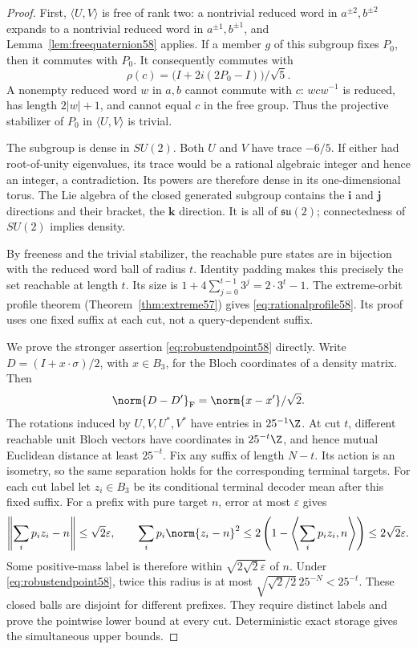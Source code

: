 \begin{proof}
First, $\langle U,V\rangle$ is free of rank two: a nontrivial reduced
word in $a^{\pm2},b^{\pm2}$ expands to a nontrivial reduced word in
$a^{\pm1},b^{\pm1}$, and Lemma~\ref{lem:freequaternion58} applies.
If a member $g$ of this subgroup fixes $P_0$, then it commutes with $P_0$.
It consequently commutes with
\[
             \rho(c)=\bigl(I+2i(2P_0-I)\bigr)/\sqrt5.
\]
A nonempty reduced word $w$ in $a,b$ cannot commute with $c$:
$wcw^{-1}$ is reduced, has length $2|w|+1$, and cannot equal $c$ in the
free group. Thus the projective stabilizer of $P_0$ in $\langle U,V\rangle$
is trivial.

The subgroup is dense in $SU(2)$. Both $U$ and $V$ have trace $-6/5$.
If either had root-of-unity eigenvalues, its trace would be a rational
algebraic integer and hence an integer, a contradiction. Its powers are
therefore dense in its one-dimensional torus. The Lie algebra of the
closed generated subgroup contains the $\mathbf i$ and $\mathbf j$
directions and their bracket, the $\mathbf k$ direction. It is all of
$\mathfrak{su}(2)$; connectedness of $SU(2)$ implies density.

By freeness and the trivial stabilizer, the reachable pure states are in
bijection with the reduced word ball of radius $t$. Identity padding
makes this precisely the set reachable at length $t$. Its size is
$1+4\sum_{j=0}^{t-1}3^j=2\cdot3^t-1$. The extreme-orbit profile theorem
(Theorem~\ref{thm:extreme57}) gives \eqref{eq:rationalprofile58}. Its proof
uses one fixed suffix at each cut, not a query-dependent suffix.

We prove the stronger assertion \eqref{eq:robustendpoint58} directly.
Write $D=(I+x\cdot\sigma)/2$, with $x\in B_3$, for the Bloch coordinates
of a density matrix. Then
\begin{equation}\label{eq:blochnorm58}
                  \norm{D-D'}_{\mathrm F}=\norm{x-x'}/\sqrt2.
\end{equation}
The rotations induced by $U,V,U^*,V^*$ have entries in
$25^{-1}\Z$. At cut $t$, different reachable unit Bloch vectors have
coordinates in $25^{-t}\Z$, and hence mutual Euclidean distance at least
$25^{-t}$. Fix any suffix of length $N-t$. Its action is an isometry, so
the same separation holds for the corresponding terminal targets.
For each cut label let $z_i\in B_3$ be its conditional terminal decoder
mean after this fixed suffix. For a prefix with pure target $n$, error
at most $\varepsilon$ gives
\[
 \left\|\sum_i p_i z_i-n\right\|\le\sqrt2\varepsilon,
 \qquad
 \sum_i p_i\norm{z_i-n}^2
       \le2\left(1-\left\langle\sum_i p_i z_i,n\right\rangle\right)
       \le2\sqrt2\varepsilon.
\]
Some positive-mass label is therefore within
$\sqrt{2\sqrt2\varepsilon}$ of $n$. Under \eqref{eq:robustendpoint58},
twice this radius is at most
$\sqrt{\sqrt2/2}\,25^{-N}<25^{-t}$. These closed balls are disjoint
for different prefixes. They require distinct labels and prove the
pointwise lower bound at every cut. Deterministic exact storage gives
the simultaneous upper bounds.


\end{proof}

